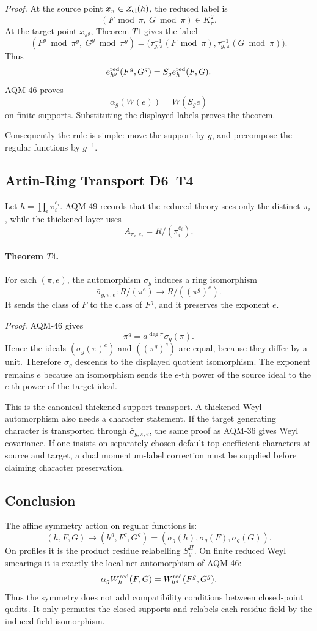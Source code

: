 \emph{Proof.}
At the source point \(x_\pi\in Z_{\rm cl}(h)\), the reduced label is
\[
  (F\bmod\pi,\ G\bmod\pi)\in K_\pi^2.
\]
At the target point \(x_{\pi^g}\), Theorem \(T1\) gives the label
\[
  (F^g\bmod\pi^g,\ G^g\bmod\pi^g)
  =
  \bigl(\tau_{g,\pi}^{-1}(F\bmod\pi),
        \tau_{g,\pi}^{-1}(G\bmod\pi)\bigr).
\]
Thus
\[
  e_{h^g}^{\rm red}(F^g,G^g)=S_g e_h^{\rm red}(F,G).
\]
AQM-46 proves
\[
  \alpha_g(W(e))=W(S_ge)
\]
on finite supports.  Substituting the displayed labels proves the theorem.

Consequently the rule is simple: move the support by \(g\), and precompose the
regular functions by \(g^{-1}\).

\subsection{Artin-Ring Transport D6--T4}
Let \(h=\prod_i\pi_i^{e_i}\).  AQM-49 records that the reduced theory sees
only the distinct \(\pi_i\), while the thickened layer uses
\[
  A_{\pi_i,e_i}=R/(\pi_i^{e_i}).
\]

\paragraph{Theorem \(T4\).}
For each \((\pi,e)\), the automorphism \(\sigma_g\) induces a ring
isomorphism
\[
  \bar\sigma_{g,\pi,e}:R/(\pi^e)\longrightarrow R/((\pi^g)^e).
\]
It sends the class of \(F\) to the class of \(F^g\), and it preserves the
exponent \(e\).

\emph{Proof.}
AQM-46 gives
\[
  \pi^g=a^{\deg\pi}\sigma_g(\pi).
\]
Hence the ideals \((\sigma_g(\pi)^e)\) and \(((\pi^g)^e)\) are equal, because
they differ by a unit.  Therefore \(\sigma_g\) descends to the displayed
quotient isomorphism.  The exponent remains \(e\) because an isomorphism sends
the \(e\)-th power of the source ideal to the \(e\)-th power of the target
ideal.

This is the canonical thickened support transport.  A thickened Weyl
automorphism also needs a character statement.  If the target generating
character is transported through \(\bar\sigma_{g,\pi,e}\), the same proof as
AQM-36 gives Weyl covariance.  If one insists on separately chosen default
top-coefficient characters at source and target, a dual momentum-label
correction must be supplied before claiming character preservation.

\subsection{Conclusion}
The affine symmetry action on regular functions is:
\[
  (h,F,G)\longmapsto(h^g,F^g,G^g)
  =
  (\sigma_g(h),\sigma_g(F),\sigma_g(G)).
\]
On profiles it is the product residue relabelling \(S_g^\Pi\).  On finite
reduced Weyl smearings it is exactly the local-net automorphism of AQM-46:
\[
  \alpha_gW_h^{\rm red}(F,G)=W_{h^g}^{\rm red}(F^g,G^g).
\]
Thus the symmetry does not add compatibility conditions between closed-point
qudits.  It only permutes the closed supports and relabels each residue field
by the induced field isomorphism.
